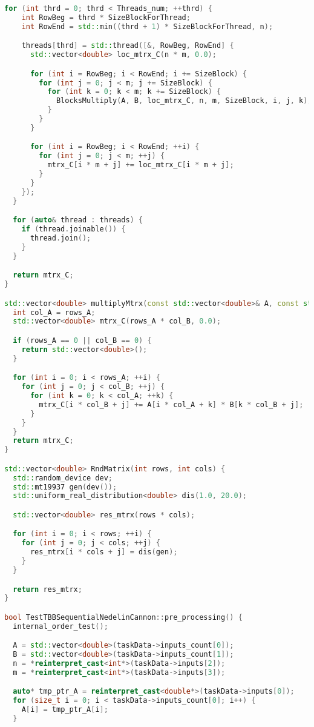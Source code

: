 \documentclass{report}
\begin{document}
\begin{lstlisting}[language=C++,caption=STL версия]
  for (int thrd = 0; thrd < Threads_num; ++thrd) {
    int RowBeg = thrd * SizeBlockForThread;
    int RowEnd = std::min((thrd + 1) * SizeBlockForThread, n);

    threads[thrd] = std::thread([&, RowBeg, RowEnd] {
      std::vector<double> loc_mtrx_C(n * m, 0.0);

      for (int i = RowBeg; i < RowEnd; i += SizeBlock) {
        for (int j = 0; j < m; j += SizeBlock) {
          for (int k = 0; k < m; k += SizeBlock) {
            BlocksMultiply(A, B, loc_mtrx_C, n, m, SizeBlock, i, j, k);
          }
        }
      }

      for (int i = RowBeg; i < RowEnd; ++i) {
        for (int j = 0; j < m; ++j) {
          mtrx_C[i * m + j] += loc_mtrx_C[i * m + j];
        }
      }
    });
  }

  for (auto& thread : threads) {
    if (thread.joinable()) {
      thread.join();
    }
  }

  return mtrx_C;
}

std::vector<double> multiplyMtrx(const std::vector<double>& A, const std::vector<double>& B, int rows_A, int col_B) {
  int col_A = rows_A;
  std::vector<double> mtrx_C(rows_A * col_B, 0.0);

  if (rows_A == 0 || col_B == 0) {
    return std::vector<double>();
  }

  for (int i = 0; i < rows_A; ++i) {
    for (int j = 0; j < col_B; ++j) {
      for (int k = 0; k < col_A; ++k) {
        mtrx_C[i * col_B + j] += A[i * col_A + k] * B[k * col_B + j];
      }
    }
  }
  return mtrx_C;
}

std::vector<double> RndMatrix(int rows, int cols) {
  std::random_device dev;
  std::mt19937 gen(dev());
  std::uniform_real_distribution<double> dis(1.0, 20.0);

  std::vector<double> res_mtrx(rows * cols);

  for (int i = 0; i < rows; ++i) {
    for (int j = 0; j < cols; ++j) {
      res_mtrx[i * cols + j] = dis(gen);
    }
  }

  return res_mtrx;
}

bool TestTBBSequentialNedelinCannon::pre_processing() {
  internal_order_test();

  A = std::vector<double>(taskData->inputs_count[0]);
  B = std::vector<double>(taskData->inputs_count[1]);
  n = *reinterpret_cast<int*>(taskData->inputs[2]);
  m = *reinterpret_cast<int*>(taskData->inputs[3]);

  auto* tmp_ptr_A = reinterpret_cast<double*>(taskData->inputs[0]);
  for (size_t i = 0; i < taskData->inputs_count[0]; i++) {
    A[i] = tmp_ptr_A[i];
  }


\end{lstlisting}
\end{document}
